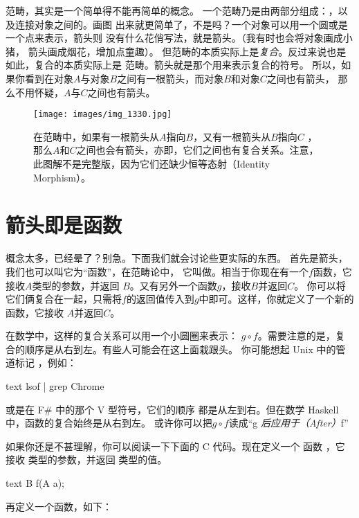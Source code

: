 
\lettrine[lhang=0.17]{范}{畴}，其实是一个简单得不能再简单的概念。
一个范畴乃是由两部分组成：，以及连接对象之间的。画图
出来就更简单了，不是吗？一个对象可以用一个圆或是一个点来表示，箭头则
没有什么花俏写法，就是箭头。（我有时也会将对象画成小猪，
箭头画成烟花，增加点童趣）。
但范畴的本质实际上是\emph{复合}。反过来说也是如此，复合的本质实际上是
范畴。箭头就是那个用来表示复合的符号。
所以，如果你看到在对象$A$与对象$B$之间有一根箭头，而对象$B$和对象$C$之间也有箭头，
那么不用怀疑，$A$与$C$之间也有箭头。


\begin{figure}
  \centering
  \texttt{[image: images/img\_1330.jpg]}
  \caption{在范畴中，如果有一根箭头从$A$指向$B$，又有一根箭头从$B$指向$C$
，那么$A$和$C$之间也会有箭头，亦即，它们之间也有复合关系。注意，此图解不是完整版，因为它们还缺少恒等态射（Identity Morphism）。 }

\end{figure}

\section{箭头即是函数}

概念太多，已经晕了？别急。下面我们就会讨论些更实际的东西。
首先是箭头，我们也可以叫它为“函数”，在范畴论中，
它叫做。相当于你现在有一个$f$函数，它接收$A$类型的参数，并返回
$B$。又有另外一个函数$g$，接收$B$并返回$C$。
你可以将它们俩复合在一起，只需将$f$的返回值传入到$g$中即可。这样，你就定义了一个新的函数，它接收
$A$并返回$C$。

在数学中，这样的复合关系可以用一个小圆圈来表示：
$g \circ f$。需要注意的是，复合的顺序是从右到左。有些人可能会在这上面栽跟头。
你可能想起 Unix 中的管道标记
，例如：

\begin{snip}{text}
lsof | grep Chrome
\end{snip}
或是在 F\# 中的那个 V 型符号\code{>>}，它们的顺序
都是从左到右。但在数学 Haskell 中，函数的复合始终是从右到左。
或许你可以把$g \circ f$读成“g\emph{ 后应用于（After）}f”

如果你还是不甚理解，你可以阅读一下下面的 C 代码。现在定义一个
函数 ，它接收  类型的参数，并返回 
 类型的值。

\begin{snip}{text}
B f(A a);
\end{snip}
再定义一个函数，如下：

